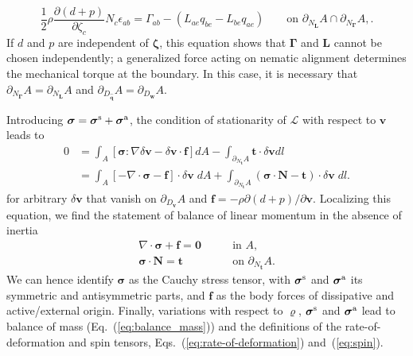 \documentclass[12pt]{iopart}
\begin{document}
    \begin{equation}
        \frac{1}{2} \rho \frac{\partial  (d+p)}{\partial \zeta_c} N_c \epsilon_{ab} = \Gamma_{ab} - \left(L_{ae} q_{be} - L_{be} q_{ae}\right) \qquad \text{on } \partial_{N_{\bm{L}}} A \cap \partial_{N_{\bm{\Gamma}}} A, 	\label{eq:border_xi_combined}.
    \end{equation}
	If $d$ and $p$ are independent of $\bm{\zeta}$, this equation shows that  $\bm{\Gamma}$ and $\bm{L}$ cannot be chosen independently; a  generalized force acting on nematic alignment determines the  mechanical torque at the boundary.  In this case, it is necessary that $\partial_{N_{\bm{\Gamma}}}A=\partial_{N_{\bm{L}}} A$ and $\partial_{D_{\hat{\bm{q}}}}A=\partial_{D_{\bm{w}}} A$.
	
Introducing $\bm{\sigma} = \bm{\sigma}^{\rm s} + \bm{\sigma}^{\rm a}$, the condition of stationarity of $\mathcal{L}$ with respect to $\bm{v}$ leads to 
	\begin{eqnarray} 
		0 &= \int_A \left[\bm{\sigma}:\nabla\delta\bm{v} - \delta\bm{v}\cdot\bm{f} \right]dA - \int_{\partial_{N_{\bm{t}}} A}  \bm{t} \cdot \delta\bm{v} dl \nonumber\\
		&=\int_A \left[-\nabla\cdot\bm{\sigma} - \bm{f} \right] \cdot \delta\bm{v}\;dA + \int_{\partial_{N_{\bm{t}}} A} \left(\bm{\sigma}\cdot \bm{N} -\bm{t} \right)\cdot \delta\bm{v} \;dl.	\label{eq:weak_v}
	\end{eqnarray}
	for arbitrary $\delta\bm{v}$ that vanish on $\partial_{D_{\bm{v}}} A$ and $\bm{f}=-\rho \partial  (d+p)/\partial \bm{v} $. Localizing this equation, we find the statement of balance of linear momentum in the absence of inertia
	\begin{eqnarray} 
		\nabla\cdot\bm{\sigma} + \bm{f} = \bm{0} \qquad & \text{in } A,\\
		\bm{\sigma}\cdot\bm{N} = \bm{t} \qquad & \text{on } \partial_{N_{\bm{t}}} A.	\label{eq:balance_linear_momentum}
	\end{eqnarray}
	We can hence identify $\bm{\sigma}$ as the Cauchy stress tensor, with $\bm{\sigma}^{\rm s}$ and $\bm{\sigma}^{\rm a}$  its symmetric and antisymmetric parts, and $\bm{f}$ as the body forces of dissipative and active/external origin.  Finally, variations with respect to $\varrho $, $\bm{\sigma}^{\rm s}$ and $\bm{\sigma}^{\rm a}$ lead to balance of mass (Eq.~(\ref{eq:balance_mass})) and the definitions of the rate-of-deformation and spin tensors, Eqs.~(\ref{eq:rate-of-deformation}) and~(\ref{eq:spin}).
\end{document}
